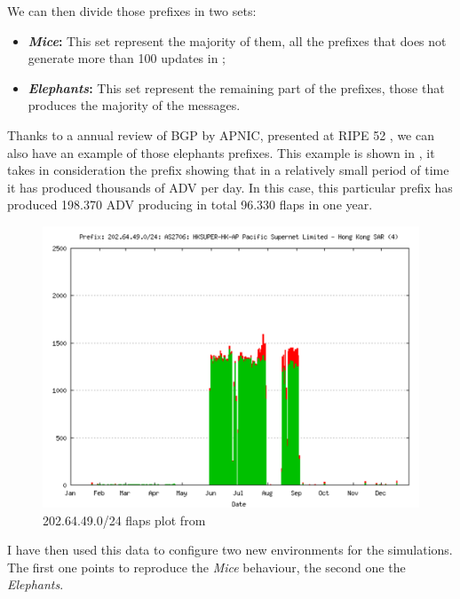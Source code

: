 We can then divide those prefixes in two sets:
\begin{itemize}
	\item \textbf{\textit{Mice}:} This set represent the majority of them,
		all the prefixes that does not generate more than \num{100} updates
		in ;
	\item \textbf{\textit{Elephants}:} This set represent the remaining part
		of the prefixes, those that produces the majority of the messages.
\end{itemize}

Thanks to a annual review of \ac{BGP} by APNIC, presented at RIPE 52 \cite{huston2006bgp},
we can also have an example of those elephants prefixes.
This example is shown in , it takes in consideration the
prefix  showing that in a relatively small period of time it has
produced thousands of \ac{ADV} per day.
In this case, this particular prefix has produced \num{198,370} \ac{ADV} producing
in total \num{96,330} flaps in one year.

\begin{figure}[h]
    \centering
    \includegraphics[scale=0.22]{images/RFD/miceVSelephants/ripePrefixFlap.png}
	\caption{202.64.49.0/24 flaps plot from \cite{huston2006bgp}}
    \label{fig:ripePrefixFlaps}
\end{figure}

I have then used this data to configure two new environments for the simulations.
The first one points to reproduce the \textit{Mice} behaviour, the second
one the \textit{Elephants}.

